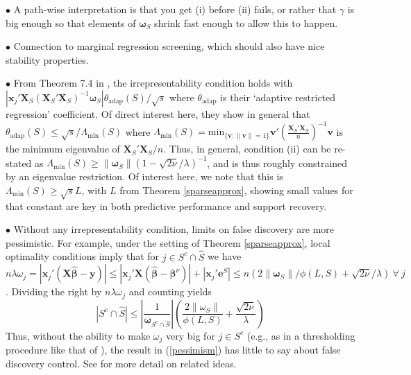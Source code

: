 \documentclass[12pt]{article}
\newcommand{\bs}[1]{\boldsymbol{#1}}
\newcommand{\mr}[1]{\mathrm{#1}}
\newcommand{\bm}[1]{\mathbf{#1}}
\begin{document}

\noindent $\bullet$ A path-wise interpretation is that you get (i) before (ii) fails, or rather that $\gamma$ is big enough so that elements of $\bs{\omega}_S$ shrink fast enough to allow this to happen.


\noindent $\bullet$ Connection to marginal regression screening, which should also have nice stability properties.

\noindent $\bullet$ From Theorem 7.4 in \cite{buhlmann_statistics_2011}, 
the irrepresentability condition holds with 
$|\bs{x}_j'\bm{X}_S(\bm{X}_S'\bm{X}_S)^{-1}\bs{\omega}_S|\theta_{\mr{adap}}(S)/\sqrt{s}$ where $\theta_{\mr{adap}}$ is their `adaptive restricted regression' coefficient.  Of direct interest here, they show in general that $\theta_{\mr{adap}}(S) \leq \sqrt{s}/\Lambda_{\mr{min}}(S)$ where $\Lambda_{\mr{min}}(S) = \mr{min}_{\{\bm{v}:\|\bm{v}\|=1\}}\bm{v}'\left(\frac{\bm{X}_S'\bm{X}_S}{n}\right)^{-1}\bm{v}$ is the minimum eigenvalue of $\bm{X}_S'\bm{X}_S/n$.  Thus, in general, condition (ii) can be re-stated as $\Lambda_{\mr{min}}(S) \geq \|\bs{\omega}_S\|(1 - \sqrt{2\nu}/\lambda)^{-1}$, and is thus roughly constrained by an eigenvalue restriction.  Of interest here, we note that this is $\Lambda_{\mr{min}}(S) \geq \sqrt{s}L$, with $L$ from Theorem \ref{sparseapprox}, showing small values for that constant are key in both predictive performance and support recovery.

\noindent $\bullet$ Without any irrepresentability condition,  limits on false discovery are more pessimistic.  For example, under the setting of Theorem \ref{sparseapprox},  local optimality
conditions imply that for $j \in S^c \cap \hat S$ we have
$n\lambda \omega_j = |\bs{x}_j'(\bm{X}\bs{\hat\beta}-\bm{y})| \leq
|\bs{x}_j'\bm{X}(\bs{\hat\beta}-\bs{\beta}^\nu)| + |\bs{x}_j'\bm{e}^S| \leq
n\left(2\|\bs{\omega}_S\|/\phi(L,S) + \sqrt{2\nu}/\lambda\right) ~\forall~j$. 
Dividing the right by $n\lambda\omega_j$ and counting yields
\begin{equation}\label{pessimism}
|S^c \cap \hat S| \leq \left|\frac{1}{\bs{\omega}_{S^c \cap \hat S}}\right|
\left(\frac{2\|\omega_S\|}{\phi(L,S)} + \frac{\sqrt{2\nu}}{\lambda}\right)
\end{equation}
Thus, without the ability to
make $\omega_j$ very big for $j \in S^c$ (e.g., as in a thresholding procedure
like that of \citealt{zhou_thresholding_2009}), the result in (\ref{pessimism}) has little to say about false discovery control.
See 
\cite{buhlmann_statistics_2011} for more detail on related ideas.
\end{document}
